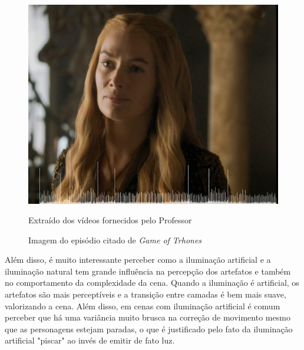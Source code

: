 \begin{figure}[H]
    \centering
    \caption{Imagem do episódio citado de \textit{Game of Trhones}}
    \label{fig:imagem19}
    
    \includegraphics[scale=0.35]{Documeto/1-ElementosTextuais/images/19.png}

    \small
    Extraído dos vídeos fornecidos pelo Professor
\end{figure}

\paragrafo Além disso, é muito interessante perceber como a iluminação artificial e a iluminação natural tem grande influência na percepção dos artefatos e também no comportamento da complexidade da cena. Quando a iluminação é artificial, os artefatos são mais perceptíveis e a transição entre camadas é bem mais suave, valorizando a cena. Além disso, em cenas com iluminação artificial é comum perceber que há uma variância muito brusca na correção de movimento mesmo que as personagens estejam paradas, o que é justificado pelo fato da iluminação artificial "piscar" ao invés de emitir de fato luz.


